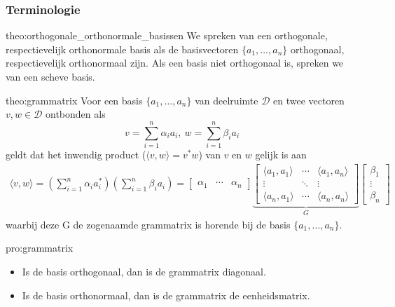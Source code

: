 \subsubsection{Terminologie}

\vspace{0.5cm}

\begin{theo}{theo:orthogonale_orthonormale_basissen}
    We spreken van een orthogonale, respectievelijk orthonormale basis als de basisvectoren $\{a_1, \ldots, a_n\}$ orthogonaal, respectievelijk orthonormaal zijn. Als een basis niet orthogonaal is, spreken we van een scheve basis.
\end{theo}

\begin{theo}[Grammatrix]{theo:grammatrix}
    Voor een basis $\{a_1, \ldots, a_n\}$ van deelruimte $\mathcal{D}$ en twee vectoren $v, w \in \mathcal{D}$ ontbonden als
    \begin{equation*}
            v = \sum_{i=1}^{n} \alpha_i a_i, \
            w = \sum_{i=1}^{n} \beta_i a_i
    \end{equation*}
    geldt dat het inwendig product ($\langle v, w \rangle = v^*w$) van $v$ en $w$ gelijk is aan
    \begin{align*}
        \langle v, w \rangle 
            = \left( \sum_{i=1}^{n} \alpha_i a_i^* \right)\left( \sum_{i=1}^{n} \beta_i a_i \right) 
            = 
                \begin{bmatrix} \alpha_1 & \cdots & \alpha_n \end{bmatrix} 
                \underbrace{\begin{bmatrix} \langle a_1, a_1 \rangle & \cdots & \langle a_1, a_n \rangle \\ \vdots & \ddots & \vdots \\ \langle a_n, a_1 \rangle & \cdots & \langle a_n, a_n \rangle \end{bmatrix}}_{G} 
                \begin{bmatrix} \beta_1 \\ \vdots \\ \beta_n \end{bmatrix}
    \end{align*}
    waarbij deze G de zogenaamde grammatrix is horende bij de basis $\{a_1, \ldots, a_n\}$. 
\end{theo}

\begin{pro}[Grammatrix]{pro:grammatrix}
    \begin{itemize}
        \item Is de basis orthogonaal, dan is de grammatrix diagonaal.
        \item Is de basis orthonormaal, dan is de grammatrix de eenheidsmatrix.
    \end{itemize}
\end{pro}

